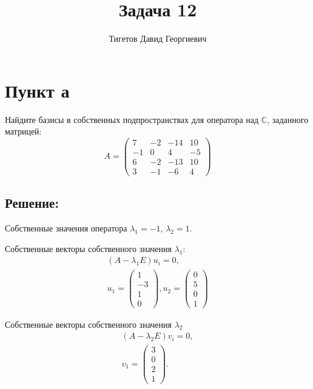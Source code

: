 \documentclass[12pt]{article}
\begin{document}
    \title{Задача 12}
    \author{Тигетов Давид Георгиевич}
    \date{}
    \maketitle

    \section*{Пункт а}
    Найдите базисы в собственных подпространствах для оператора над $\mathbb{C}$, заданного матрицей:
    \[
        A =
        \begin{pmatrix}
            7  & -2 & -14 & 10 \\
            -1 & 0  & 4   & -5 \\
            6  & -2 & -13 & 10 \\
            3  & -1 & -6  & 4
        \end{pmatrix}
    \]

    \subsection*{Решение:}
    Собственные значения оператора $\lambda_1 = -1$, $\lambda_2 = 1$.

    Собственные векторы собственного значения $\lambda_1$:
    \begin{gather*}
        \left ( A - \lambda_1 E \right ) u_i = 0, \\
        u_1 = \begin{pmatrix}
                  1 \\ -3 \\ 1 \\ 0
        \end{pmatrix},
        u_2 = \begin{pmatrix}
                  0 \\ 5 \\ 0 \\ 1
        \end{pmatrix}
    \end{gather*}

    Собственные векторы собственного значения $\lambda_2$
    \begin{gather*}
        \left ( A - \lambda_2 E \right ) v_i = 0, \\
        v_1 = \begin{pmatrix}
                  3 \\ 0 \\ 2 \\ 1
        \end{pmatrix} .
    \end{gather*}
\end{document}
